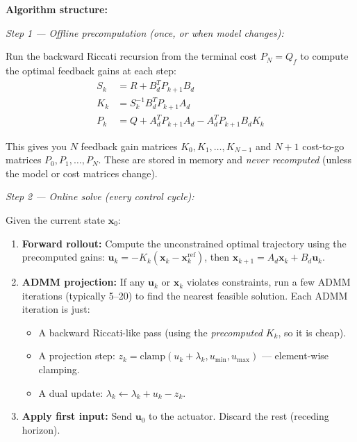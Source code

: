 \textbf{Algorithm structure:}

\textit{Step 1 --- Offline precomputation (once, or when model changes):}

Run the backward Riccati recursion from the terminal cost $P_N = Q_f$ to compute the optimal feedback gains at each step:
\begin{align}
S_k &= R + B_d^T P_{k+1} B_d \\
K_k &= S_k^{-1} B_d^T P_{k+1} A_d \\
P_k &= Q + A_d^T P_{k+1} A_d - A_d^T P_{k+1} B_d K_k
\end{align}

This gives you $N$ feedback gain matrices $K_0, K_1, \ldots, K_{N-1}$ and $N+1$ cost-to-go matrices $P_0, P_1, \ldots, P_N$. These are stored in memory and \textit{never recomputed} (unless the model or cost matrices change).

\textit{Step 2 --- Online solve (every control cycle):}

Given the current state $\mathbf{x}_0$:
\begin{enumerate}
    \item \textbf{Forward rollout:} Compute the unconstrained optimal trajectory using the precomputed gains: $\mathbf{u}_k = -K_k (\mathbf{x}_k - \mathbf{x}_k^{\text{ref}})$, then $\mathbf{x}_{k+1} = A_d \mathbf{x}_k + B_d \mathbf{u}_k$.
    \item \textbf{ADMM projection:} If any $\mathbf{u}_k$ or $\mathbf{x}_k$ violates constraints, run a few ADMM iterations (typically 5--20) to find the nearest feasible solution. Each ADMM iteration is just:
    \begin{itemize}[nosep]
        \item A backward Riccati-like pass (using the \textit{precomputed} $K_k$, so it is cheap).
        \item A projection step: $z_k = \text{clamp}(u_k + \lambda_k, u_{\min}, u_{\max})$ --- element-wise clamping.
        \item A dual update: $\lambda_k \leftarrow \lambda_k + u_k - z_k$.
    \end{itemize}
    \item \textbf{Apply first input:} Send $\mathbf{u}_0$ to the actuator. Discard the rest (receding horizon).
\end{enumerate}

